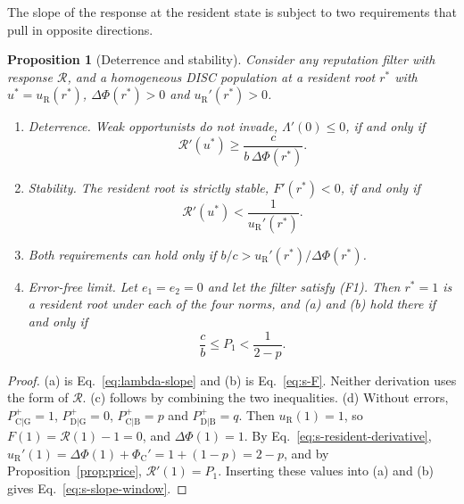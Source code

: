 \documentclass[10pt]{wlscirep}
\newcommand{\Rmap}{\mathscr{R}}            %
\newcommand{\Pp}[1]{P^{+}_{\mathrm{#1}}}   %
\newcommand{\PhiC}{\Phi_{\mathrm{C}}}
\newcommand{\Pone}{P_{1}}                  %
\theoremstyle{plain}
\newtheorem{proposition}[lemma]{Proposition}
\theoremstyle{remark}
\begin{document}
The slope of the response at the resident state is subject to two requirements that pull in opposite directions.

\begin{proposition}[Deterrence and stability]\label{prop:slope}
Consider any reputation filter with response $\Rmap$, and a homogeneous DISC population at a resident root $r^*$ with $u^*=u_{\mathrm R}(r^*)$, $\Delta\Phi(r^*)>0$ and $u_{\mathrm R}'(r^*)>0$.
\begin{enumerate}
\item[(a)] \textit{Deterrence.} Weak opportunists do not invade, $\Lambda'(0)\leq0$, if and only if
\begin{equation}
\Rmap'(u^*)\geq\frac{c}{b\,\Delta\Phi(r^*)}.
\label{eq:s-slope-deterrence}
\end{equation}
\item[(b)] \textit{Stability.} The resident root is strictly stable, $F'(r^*)<0$, if and only if
\begin{equation}
\Rmap'(u^*)<\frac{1}{u_{\mathrm R}'(r^*)}.
\label{eq:s-slope-stability}
\end{equation}
\item[(c)] Both requirements can hold only if $b/c>u_{\mathrm R}'(r^*)/\Delta\Phi(r^*)$.
\item[(d)] \textit{Error-free limit.} Let $e_1=e_2=0$ and let the filter satisfy (F1). Then $r^*=1$ is a resident root under each of the four norms, and (a) and (b) hold there if and only if
\begin{equation}
\frac{c}{b}\leq\Pone<\frac{1}{2-p}.
\label{eq:s-slope-window}
\end{equation}
\end{enumerate}
\end{proposition}
\begin{proof}
(a) is Eq.~\eqref{eq:lambda-slope} and (b) is Eq.~\eqref{eq:s-F}. Neither derivation uses the form of $\Rmap$. (c) follows by combining the two inequalities. (d) Without errors, $\Pp{C|G}=1$, $\Pp{D|G}=0$, $\Pp{C|B}=p$ and $\Pp{D|B}=q$. Then $u_{\mathrm R}(1)=1$, so $F(1)=\Rmap(1)-1=0$, and $\Delta\Phi(1)=1$. By Eq.~\eqref{eq:s-resident-derivative}, $u_{\mathrm R}'(1)=\Delta\Phi(1)+\PhiC'=1+(1-p)=2-p$, and by Proposition~\ref{prop:price}, $\Rmap'(1)=\Pone$. Inserting these values into (a) and (b) gives Eq.~\eqref{eq:s-slope-window}.
\end{proof}
\end{document}
